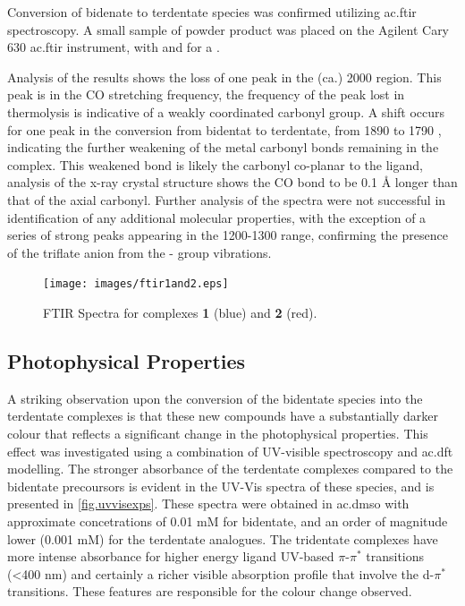 Conversion of bidenate to terdentate species was confirmed utilizing \gls{ac.ftir} spectroscopy. A small sample of powder product was placed on the Agilent Cary 630 \gls{ac.ftir} instrument, with  and for a .

Analysis of the results shows the loss of one peak in the (ca.) 2000  region. This peak is in the CO stretching frequency, the frequency of the peak lost in thermolysis is indicative of a weakly coordinated carbonyl group. A shift occurs for one peak in the conversion from bidentat to terdentate, from 1890 to 1790 , indicating the further weakening of the metal carbonyl bonds remaining in the complex. This weakened bond is likely the carbonyl co-planar to the ligand, analysis of the x-ray crystal structure shows the CO bond to be 0.1 \r{A} longer than that of the axial carbonyl. Further analysis of the spectra were not successful in identification of any additional molecular properties, with the exception of a series of strong peaks appearing in the 1200-1300  range, confirming the presence of the triflate anion from the - group vibrations. 

\begin{figure}[!htbp]
 \begin{center}
  \texttt{[image: images/ftir1and2.eps]}
 \end{center}
\caption[FTIR Spectra for complexes \textbf{1} and \textbf{2}]{FTIR Spectra for complexes \textbf{1} (blue) and \textbf{2} (red).}
\label{fig.ir1}
\end{figure} 

\subsection{Photophysical Properties}

A striking observation upon the conversion of the bidentate species into the terdentate complexes is that these new compounds have a substantially darker colour that reflects a significant change in the photophysical properties. This effect was investigated using a combination of UV-visible spectroscopy and \gls{ac.dft} modelling. The stronger  absorbance of the terdentate complexes compared to the bidentate precoursors is evident in the UV-Vis spectra of these species, and is presented in \autoref{fig.uvvisexps}. These spectra were obtained in \gls{ac.dmso} with approximate concetrations of 0.01 mM for bidentate, and an order of magnitude lower (0.001 mM) for the terdentate analogues. The tridentate complexes have more intense absorbance for higher energy ligand UV-based $\pi$-$\pi^\ast$ transitions (\textless 400 nm) and certainly a richer visible absorption profile that involve the d-$\pi^\ast$ transitions. These features are responsible for the colour change observed.

